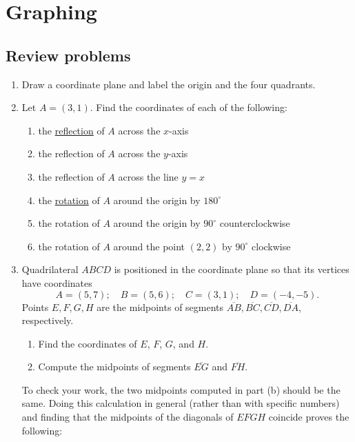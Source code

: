 \section{Graphing}

\subsection{Review problems}

\begin{enumerate}
\item Draw a coordinate plane and label the origin and the four quadrants.
\item Let $A = (3,1)$. Find the coordinates of each of the following:
\begin{enumerate}
\item the \href{https://en.wikipedia.org/wiki/Reflection_(mathematics)}{reflection} of $A$ across the $x$-axis
\item the reflection of $A$ across the $y$-axis
\item the reflection of $A$ across the line $y = x$
\item the \href{https://en.wikipedia.org/wiki/Rotation_(mathematics)}{rotation} of $A$ around the origin by $180^{\circ}$
\item the rotation of $A$ around the origin by $90^{\circ}$ counterclockwise
\item the rotation of $A$ around the point $(2,2)$ by $90^{\circ}$ clockwise
\end{enumerate}
\item Quadrilateral $ABCD$ is positioned in the coordinate plane so that its vertices have coordinates
\begin{equation*}
A = (5, 7);\quad B = (5, 6);\quad C = (3, 1);\quad D = (-4, -5).
\end{equation*}
Points $E, F, G, H$ are the midpoints of segments $\overline{AB}, \overline{BC}, \overline{CD}, \overline{DA}$, respectively.
\begin{enumerate}
\item Find the coordinates of $E$, $F$, $G$, and $H$.
\item Compute the midpoints of segments $\overline{EG}$ and $\overline{FH}$.
\end{enumerate}
To check your work, the two midpoints computed in part (b) should be the same. Doing this calculation in general (rather than with specific numbers) and finding that the midpoints of the diagonals of $EFGH$ coincide proves the following:
\begin{quote}

\end{quote}
\end{enumerate}
